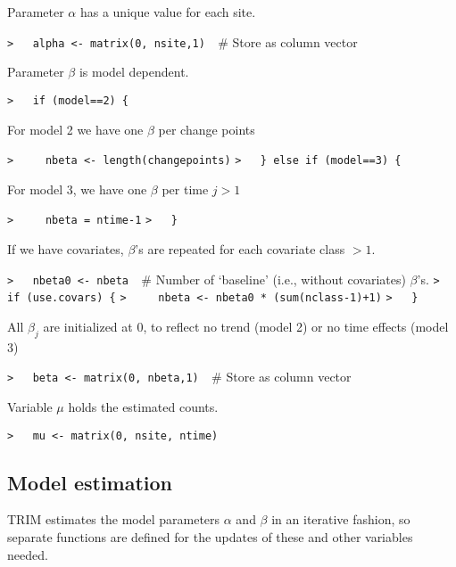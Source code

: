 \documentclass[a4paper]{article}
\begin{document}
Parameter $\alpha$ has a unique value for each site.\par
\verb~>   alpha <- matrix(0, nsite,1)  ~{\sffamily\# Store as column vector}\par

Parameter $\beta$ is model dependent.\par
\verb~>   if (model==2) {~\par
For model 2 we have one $\beta$ per change points\par
\verb~>     nbeta <- length(changepoints)~\newline
\verb~>   } else if (model==3) {~\par
For model 3, we have one $\beta$ per time $j>1$\par
\verb~>     nbeta = ntime-1~\newline
\verb~>   }~\par
If we have covariates, $\beta$'s are repeated for each covariate class $>1$.\par
\verb~>   nbeta0 <- nbeta  ~{\sffamily\# Number of `baseline' (i.e., without covariates) $\beta$'s.}\newline
\verb~>   if (use.covars) {~\newline
\verb~>     nbeta <- nbeta0 * (sum(nclass-1)+1)~\newline
\verb~>   }~\par

All $\beta_j$ are initialized at 0, to reflect no trend (model 2) or no time effects (model 3)\par
\verb~>   beta <- matrix(0, nbeta,1)  ~{\sffamily\# Store as column vector}\par

Variable $\mu$ holds the estimated counts.\par
\verb~>   mu <- matrix(0, nsite, ntime)~\par




\subsection{Model estimation}\par

TRIM estimates the model parameters $\alpha$ and $\beta$ in an iterative fashion,
so separate functions are defined for the updates of these and other variables needed.\par
\end{document}
